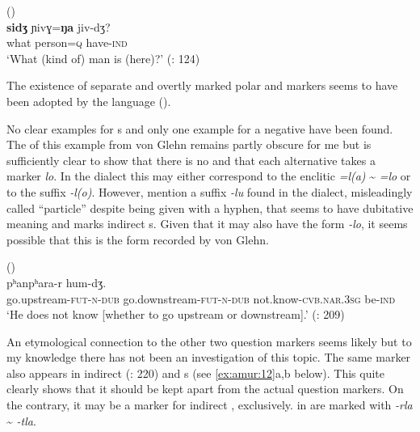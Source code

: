 \ea%
    \label{ex:amur:9}
     ()\\
    \gll \textbf{{sidʒ}} ɲivɣ=\textbf{ŋa} {jiv-dʒ?}\\
    what  person=\textsc{q}  have-\textsc{ind}\\
    \glt ‘What (kind of) man is (here)?’ (\citealt{NedjalkovOtaina2013}: 124)
    \z

\noindent The existence of separate and overtly marked polar and  markers seems to have been adopted by the  language  ().

No clear examples for s and only one example for a negative  have been found. The  of this example from von Glehn \citep[31]{Grube1892} remains partly obscure for me but is sufficiently clear to show that there is no  and that each alternative takes a marker \textit{lo}. In the  dialect this may either correspond to the enclitic \textit{=l(a)} {\textasciitilde} \textit{=lo} or to the suffix \textit{-l(o)}. However, \cite[125, 209]{NedjalkovOtaina2013} mention a suffix \textit{-lu} found in the  dialect, misleadingly called “particle” despite being given with a hyphen, that seems to have dubitative meaning and marks indirect s. Given that it may also have the form \textit{-lo}, it seems possible that this is the form recorded by von Glehn.

\ea%
    \label{ex:amur:10}
     ()\\
     pʰanpʰara-r      hum-dʒ.\\
    go.upstream-\textsc{fut}-\textsc{n}-\textsc{dub}  go.downstream-\textsc{fut}-\textsc{n}-\textsc{dub} not.know-\textsc{cvb.nar}.3\textsc{sg}  be-\textsc{ind}\\
    \glt ‘He does not know [whether to go upstream or downstream].’ (\citealt{NedjalkovOtaina2013}: 209)
    \z

\noindent An etymological connection to the other two question markers seems likely but to my knowledge there has not been an investigation of this topic. The same marker also appears in indirect  (\citealt{NedjalkovOtaina2013}: 220) and s (see \ref{ex:amur:12}a,b below). This quite clearly shows that it should be kept apart from the actual question markers. On the contrary, it may be a marker for indirect , exclusively.  in  are marked with \textit{-rla} {\textasciitilde} \textit{-tla}.

